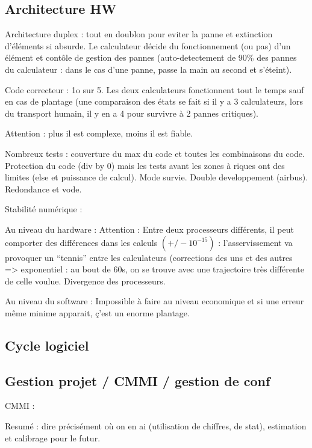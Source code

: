 \documentclass[a4paper,12pt]{article}
\begin{document}
\subsection{Architecture HW}
Architecture duplex : tout en doublon pour eviter la panne et extinction d'éléments si absurde.
Le calculateur décide du fonctionnement (ou pas) d'un élément et contôle de gestion des pannes (auto-detectement de 90\% des pannes du calculateur : dans le cas d'une panne, passe la main au second et s'éteint).

Code correcteur : 1o sur 5. Les deux calculateurs fonctionnent tout le temps sauf en cas de plantage (une comparaison des états se fait si il y a 3 calculateurs, lors du transport humain, il y en a 4 pour survivre à 2 pannes critiques).

Attention : plus il est complexe, moins il est fiable.




Nombreux tests : couverture du max du code et toutes les combinaisons du code. Protection du code (div by 0) mais les tests avant les zones à riques ont des limites (else et puissance de calcul). Mode survie. Double developpement (airbus). Redondance et vode.

Stabilité numérique :

Au niveau du hardware :
Attention : Entre deux processeurs différents, il peut comporter des différences dans les calculs \begin{math}(+/-10^{-15})\end{math} : l'asservissement va provoquer un ``tennis'' entre les calculateurs (corrections des uns et des autres => exponentiel : au bout de 60s, on se trouve avec une trajectoire très différente de celle voulue. Divergence des processeurs.

Au niveau du software :
Impossible à faire au niveau economique et si une erreur même minime apparait, ç'est un enorme plantage.


\subsection{Cycle logiciel}

\subsection{Gestion projet / CMMI / gestion de conf}
CMMI :

Resumé : dire précisément où on en ai (utilisation de chiffres, de stat), estimation et calibrage pour le futur.
\end{document}
